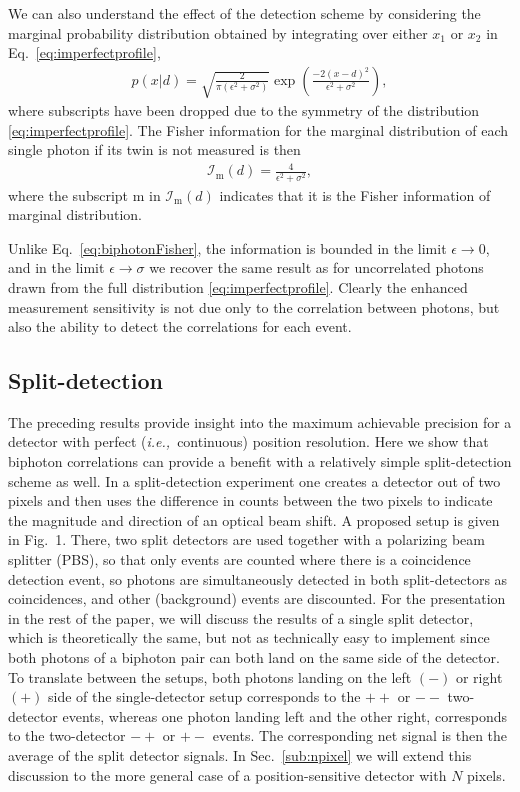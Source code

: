 We can also understand the effect of the detection scheme by considering the marginal probability distribution obtained by integrating over either $x_1$ or $x_2$ in Eq.~\eqref{eq:imperfectprofile},
\begin{align}
	p(x|d) = \sqrt{\frac{2}{\pi(\epsilon^2 + \sigma^2)}} \exp\left(\frac{-2(x-d)^2}{\epsilon^2 + \sigma^2} \right),
\end{align}
where subscripts have been dropped due to the symmetry of the distribution \eqref{eq:imperfectprofile}.
The Fisher information for the marginal distribution of each single photon if its twin is not measured is then 
\begin{align}\label{eq:margfisher}
	\mathcal{I}_\textrm{m}(d) = \frac{4}{\epsilon^2 + \sigma^2},
\end{align}
where the subscript m in $\mathcal{I}_\textrm{m}(d)$ indicates that it is the Fisher information of marginal distribution. 

Unlike Eq.~\eqref{eq:biphotonFisher}, the information is bounded in the limit $\epsilon \rightarrow 0$, and in the limit $\epsilon \rightarrow \sigma$ we recover the same result as for uncorrelated photons drawn from the full distribution \eqref{eq:imperfectprofile}.
Clearly the enhanced measurement sensitivity is not due only to the correlation between photons, but also the ability to detect the correlations for each event.

\subsection{Split-detection}\label{sub:split-detection}

The preceding results provide insight into the maximum achievable precision for a detector with perfect (\emph{i.e.,}~continuous) position resolution.  
Here we show that biphoton correlations can provide a benefit with a relatively simple split-detection scheme as well.  In a split-detection experiment one creates a detector out of two pixels and then uses the difference in counts between the two pixels to indicate the magnitude and direction of an optical beam shift.  A proposed setup is given in Fig.~1.  There, two split detectors are used together with a polarizing beam splitter (PBS), so that only events are counted where there is a coincidence detection event, so photons are simultaneously detected in both split-detectors as coincidences, and other (background) events are discounted.  For the presentation in the rest of the paper, we will discuss the results of a single split detector, which is theoretically the same, but not as technically easy to implement since both photons of a biphoton pair can both land on the same side of the detector.  To translate between the setups, both photons landing on the left $(-)$ or right $(+)$ side of the single-detector setup corresponds to the $++$ or $--$ two-detector events, whereas one photon landing left and the other right, corresponds to the two-detector $-+$ or $+-$ events.  The corresponding net signal is then the average of the split detector signals.  In Sec.~\ref{sub:npixel} we will extend this discussion to the more general case of a position-sensitive detector with $N$ pixels.

